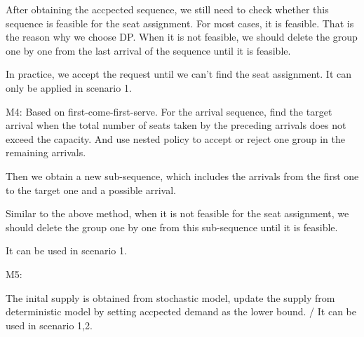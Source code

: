After obtaining the accpected sequence, we still need to check whether this sequence is feasible for the seat assignment. For most cases, it is feasible. That is the reason why we choose DP. When it is not feasible, we should delete the group one by one from the last arrival of the sequence until it is feasible.

In practice, we accept the request until we can't find the seat assignment. It can only be applied in scenario 1.







M4: Based on first-come-first-serve. For the arrival sequence, find the target arrival when the total number of seats taken by the preceding arrivals does not exceed the capacity. And use nested policy to accept or reject one group in the remaining arrivals.

Then we obtain a new sub-sequence, which includes the arrivals from the first one to the target one and a possible arrival.

Similar to the above method, when it is not feasible for the seat assignment, we should delete the group one by one from this sub-sequence until it is feasible.

It can be used in scenario 1. 



M5: 

The inital supply is obtained from stochastic model, update the supply from deterministic model by setting accpected demand as the lower bound. / It can be used in scenario 1,2.

